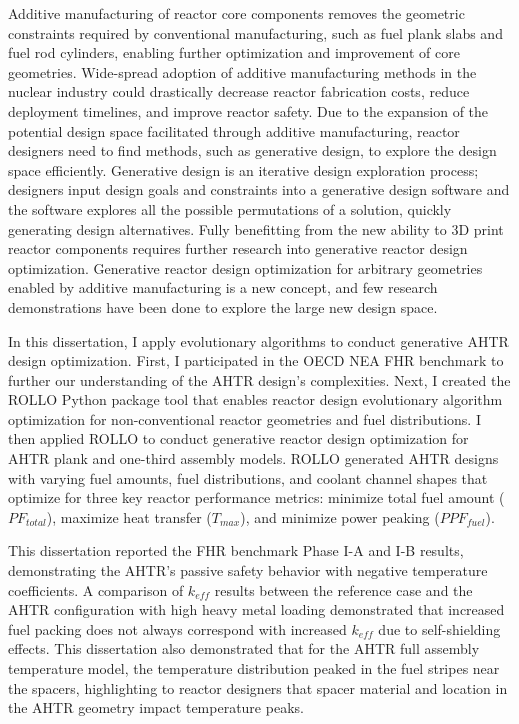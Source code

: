 
Additive manufacturing of reactor core components removes the geometric constraints
required by conventional manufacturing, such as fuel plank slabs and fuel rod 
cylinders, enabling further optimization and improvement of core geometries. 
Wide-spread adoption of additive manufacturing methods in the nuclear industry 
could drastically decrease reactor fabrication costs, reduce deployment timelines, 
and improve reactor safety. 
Due to the expansion of the potential design space facilitated through additive 
manufacturing, reactor designers need to find methods, such as generative 
design, to explore the design space efficiently.
Generative design is an iterative design exploration process; designers input design 
goals and constraints into a generative design software and the software explores 
all the possible permutations of a solution, quickly generating design alternatives. 
Fully benefitting from the new ability to 3D print reactor components requires further 
research into generative reactor design optimization.  
Generative reactor design optimization for arbitrary geometries enabled by additive 
manufacturing is a new concept, and few research demonstrations have been done to 
explore the large new design space. 

In this dissertation, I apply evolutionary algorithms to conduct generative \gls{AHTR} 
design optimization. 
First, I participated in the \gls{OECD} \gls{NEA} \gls{FHR} benchmark to further our 
understanding of the \gls{AHTR} design's complexities.  
Next, I created the \gls{ROLLO} Python package tool that enables reactor design 
evolutionary algorithm optimization for non-conventional reactor geometries and fuel 
distributions. 
I then applied \gls{ROLLO} to conduct generative reactor design optimization
for \gls{AHTR} plank and one-third assembly models.
\gls{ROLLO} generated \gls{AHTR} designs with varying fuel amounts, fuel 
distributions, and coolant channel shapes that optimize for three key reactor 
performance metrics: minimize total fuel amount ($PF_{total}$), maximize heat 
transfer ($T_{max}$), and minimize power peaking ($PPF_{fuel}$).

This dissertation reported the \gls{FHR} benchmark Phase I-A and I-B results, 
demonstrating the \gls{AHTR}'s passive safety behavior with 
negative temperature coefficients.
A comparison of $k_{eff}$ results between the reference case and the \gls{AHTR} 
configuration with high heavy metal loading demonstrated that increased fuel 
packing does not always correspond with increased $k_{eff}$ due to self-shielding 
effects.
This dissertation also demonstrated that for the \gls{AHTR} full assembly temperature 
model, the temperature distribution peaked in the fuel stripes near the spacers, 
highlighting to reactor designers that spacer material and location in the 
\gls{AHTR} geometry impact temperature peaks.  


